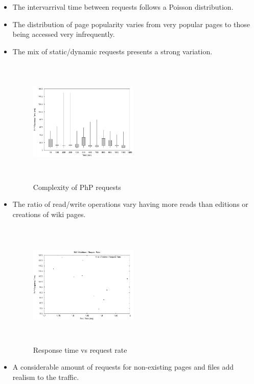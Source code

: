 \begin{itemize}
\item The intervarrival time between requests follows a Poisson distribution.

\item The distribution of page popularity varies from very popular pages to those being accessed very infrequently.

\item The mix of static/dynamic requests presents a strong variation. 

\begin{figure}
\begin{center}
\includegraphics[width=0.49\textwidth, height=6cm]{./images/phpRespTimeDispersion}
\end{center}
\caption{Complexity of PhP requests}
\label{phpRespTimeDispersion}
\end{figure}

\item The ratio of read/write operations vary having more reads than editions or creations of wiki pages.

\begin{figure}
\begin{center}
\includegraphics[width=0.49\textwidth, height=6cm]{./images/staticProv_reqRate}
\end{center}
\caption{Response time vs request rate}
\label{reqRate}
\end{figure}

\item A considerable amount of requests for non-existing pages and files add realism to the traffic.

\end{itemize}


